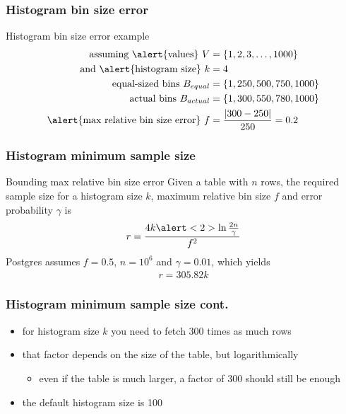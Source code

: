 \documentclass{beamer}
\begin{document}
\begin{frame}
  \frametitle{Histogram bin size error}

  \begin{block}{Histogram bin size error example}
    \begin{align*}
    \text{assuming \alert{values}}\ V &= \{1, 2, 3, \dots, 1000\}\\
    \text{and \alert{histogram size}}\ k &= 4\\
    \text{equal-sized bins}\ B_{equal} &= \{1, 250, 500, 750, 1000\}\\
    \text{actual bins}\ B_{actual} &= \{1, 300, 550, 780, 1000\}\\
    \text{\alert{max relative bin size error}}\ f &= \frac{|300 - 250|}{250} = 0.2
    \end{align*}
  \end{block}
\end{frame}

\begin{frame}
  \frametitle{Histogram minimum sample size}

  \begin{block}{Bounding max relative bin size error}
    Given a table with \alert<2>{$n$ rows}, the required sample size for a
    histogram size $k$, maximum relative bin size $f$ and error probability
    $\gamma$ is
    \begin{align*}
      r = \frac{4k\alert<2>{\ln{\frac{2n}{\gamma}}}}{f^{2}}
    \end{align*}
    Postgres assumes $f = 0.5$, $n = 10^{6}$ and $\gamma = 0.01$, which yields
    \begin{align*}
      r = 305.82 k
    \end{align*}
  \end{block}
\end{frame}

\begin{frame}
  \frametitle{Histogram minimum sample size cont.}

  \begin{itemize}
  \item for histogram size $k$ you need to fetch \alert{300 times} as much rows
  \item that factor depends on the size of the table, but \alert{logarithmically}
    \begin{itemize}
    \item even if the table is much larger, a factor of 300 should still be enough
    \end{itemize}
  \item the default histogram size is 100
  \end{itemize}
\end{frame}
\end{document}
